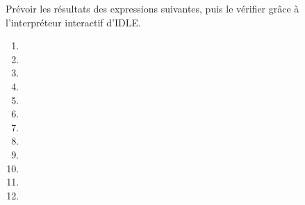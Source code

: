 Prévoir les résultats des expressions suivantes, puis le vérifier grâce à l'interpréteur interactif d'IDLE.

\begin{multicols}{3}
  \begin{enumerate}[label=\emph{\alph*)}]
    \item {}
    \item {}
    \item {}
    \item {}
    \item {}
    \item {}
    \item {}
    \item {}
    \item {}
    \item {}
    \item {}
    \item {}
  \end{enumerate}
\end{multicols}